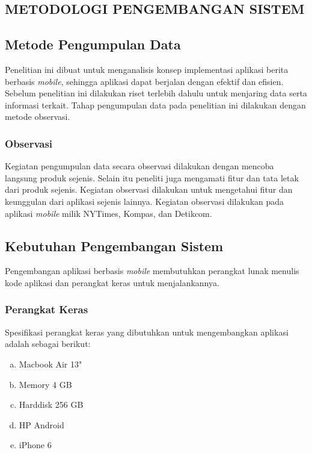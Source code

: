 \begin{spacing}{2}
\chapter{METODOLOGI PENGEMBANGAN SISTEM}

\section{Metode Pengumpulan Data}
	Penelitian ini dibuat untuk menganalisis konsep implementasi aplikasi berita berbasis \emph{mobile}, sehingga aplikasi dapat berjalan dengan efektif dan efisien. Sebelum penelitian ini dilakukan riset terlebih dahulu untuk menjaring data serta informasi terkait. Tahap pengumpulan data pada penelitian ini dilakukan dengan metode observasi.

	\subsection{Observasi}
		Kegiatan pengumpulan data secara observasi dilakukan dengan mencoba langsung produk sejenis. Selain itu peneliti juga mengamati fitur dan tata letak dari produk sejenis. Kegiatan observasi dilakukan untuk mengetahui fitur dan keunggulan dari aplikasi sejenis lainnya. Kegiatan observasi dilakukan pada aplikasi \emph{mobile} milik NYTimes, Kompas, dan Detikcom.

\section{Kebutuhan Pengembangan Sistem}
	Pengembangan aplikasi berbasis \emph{mobile} membutuhkan perangkat lunak menulis kode aplikasi dan perangkat keras untuk menjalankannya.

	\subsection{Perangkat Keras}
		Spesifikasi perangkat keras yang dibutuhkan untuk mengembangkan aplikasi adalah sebagai berikut:

		\vspace{-0.5cm}

		\begin{enumerate}[a.]
		\itemsep0em
			\item Macbook Air 13"
			\item Memory 4 GB
			\item Harddisk 256 GB
			\item HP Android
			\item iPhone 6
		\end{enumerate}


\end{spacing}
